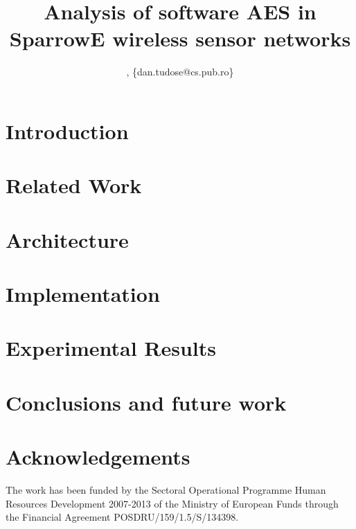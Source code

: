 \documentclass[conference]{IEEEtran}
\begin{document}
\title{Analysis of software AES in SparrowE wireless sensor networks}

\author{
, \{dan.tudose@cs.pub.ro\}
}

\maketitle

\begin{abstract} 

\end{abstract}

\section{Introduction}
\label{sec:introduction}


\section{Related Work}
\label{sec:related}


\section{Architecture}
\label{sec:architecture}


\section{Implementation}
\label{sec:implementation}


\section{Experimental Results}
\label{sec:results}


\section{Conclusions and future work}
\label{sec:conclusions}


\section{Acknowledgements}
\label{sec:Acknowledgements}
The work has been funded by the Sectoral Operational Programme Human Resources Development 2007-2013 of the Ministry of European Funds through the Financial Agreement POSDRU/159/1.5/S/134398.




\end{document}

